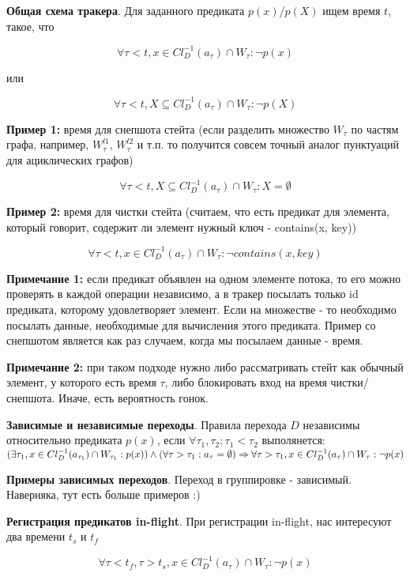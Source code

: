 \documentclass[12pt]{article}
\begin{document}



\textbf{Общая схема тракера}. Для заданного предиката $p(x)$/$p(X)$ ищем время $t$, такое, что

$$\forall \tau < t, x \in Cl^{-1}_D(a_\tau) \cap W_\tau : \neg p(x)$$

или

$$\forall \tau < t, X \subseteq Cl^{-1}_D(a_\tau) \cap W_\tau : \neg p(X)$$


\textbf{Пример 1:} время для снепшота стейта (если разделить множество $W_\tau$ по частям графа, например, $W^{l1}_\tau$, $W^{l2}_\tau$ и т.п. то получится совсем точный аналог пунктуаций для ациклических графов)

$$\forall \tau < t, X \subseteq Cl^{-1}_D(a_\tau) \cap W_\tau : X = \emptyset$$

\textbf{Пример 2:} время для чистки стейта (считаем, что есть предикат для элемента, который говорит, содержит ли элемент нужный ключ - contains(x, key))

$$\forall \tau < t, x \in Cl^{-1}_D(a_\tau) \cap W_\tau : \neg contains(x,key)$$

\textbf{Примечание 1:} если предикат объявлен на одном элементе потока, то его можно проверять в каждой операции независимо, а в тракер посылать только id предиката, которому удовлетворяет элемент. Если на множестве - то необходимо посылать данные, необходимые для вычисления этого предиката. Пример со снепшотом является как раз случаем, когда мы посылаем данные - время.

\textbf{Примечание 2:} при таком подходе нужно либо рассматривать стейт как обычный элемент, у которого есть время $\tau$, либо блокировать вход на время чистки/снепшота. Иначе, есть вероятность гонок.

\textbf{Зависимые и независимые переходы}. Правила перехода $D$ независимы относительно предиката $p(x)$, если $\forall \tau_1, \tau_2 : \tau_1 < \tau_2$ выполянется:\\

$(\exists \tau_1,x \in Cl^{-1}_D(a_{\tau_1}) \cap W_{\tau_1} : p(x)) \land (\forall \tau > \tau_1 : a_\tau = \emptyset) \Rightarrow \\ \forall \tau > \tau_1, x \in Cl^{-1}_D(a_{\tau}) \cap W_{\tau} : \neg p(x)$

\textbf{Примеры зависимых переходов}. Переход в группировке - зависимый. Наверняка, тут есть больше примеров :)

\textbf{Регистрация предикатов in-flight}. При регистрации in-flight, нас интересуют два времени $t_s$ и $t_f$

$$\forall \tau < t_f, \tau > t_s, x \in Cl^{-1}_D(a_\tau) \cap W_\tau : \neg p(x)$$
\end{document}
